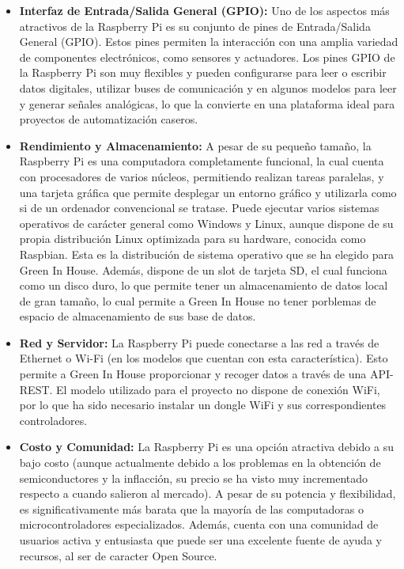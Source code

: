 \begin{itemize}
    \item \textbf{Interfaz de Entrada/Salida General (GPIO):} Uno de los aspectos más atractivos de la Raspberry Pi es su conjunto de pines de Entrada/Salida General (GPIO). Estos pines permiten la interacción con una amplia variedad de componentes electrónicos, como sensores y actuadores. Los pines GPIO de la Raspberry Pi son muy flexibles y pueden configurarse para leer o escribir datos digitales, utilizar buses de comunicación y en algunos modelos para leer y generar señales analógicas, lo que la convierte en una plataforma ideal para proyectos de automatización caseros.
    \item \textbf{Rendimiento y Almacenamiento:} A pesar de su pequeño tamaño, la Raspberry Pi es una computadora completamente funcional, la cual cuenta con procesadores de varios núcleos, permitiendo realizan tareas paralelas, y una tarjeta gráfica que permite desplegar un entorno gráfico y utilizarla como si de un ordenador convencional se tratase. Puede ejecutar varios sistemas operativos de carácter general como Windows y Linux, aunque dispone de su propia distribución Linux optimizada para su hardware, conocida como Raspbian. Esta es la distribución de sistema operativo que se ha elegido para Green In House. Además, dispone de un slot de tarjeta SD, el cual funciona como un disco duro, lo que permite tener un almacenamiento de datos local de gran tamaño, lo cual permite a Green In House no tener porblemas de espacio de almacenamiento de sus base de datos.
    \item \textbf{Red y Servidor:} La Raspberry Pi puede conectarse a las red a través de Ethernet o Wi-Fi (en los modelos que cuentan con esta característica). Esto permite a Green In House proporcionar y recoger datos a través de una API-REST. El modelo utilizado para el proyecto no dispone de conexión WiFi, por lo que ha sido necesario instalar un dongle WiFi y sus correspondientes controladores.
    \item \textbf{Costo y Comunidad:} La Raspberry Pi es una opción atractiva debido a su bajo costo (aunque actualmente debido a los problemas en la obtención de semiconductores y la inflacción, su precio se ha visto muy incrementado respecto a cuando salieron al mercado). A pesar de su potencia y flexibilidad, es significativamente más barata que la mayoría de las computadoras o microcontroladores especializados. Además, cuenta con una comunidad de usuarios activa y entusiasta que puede ser una excelente fuente de ayuda y recursos, al ser de caracter Open Source.
\end{itemize}

